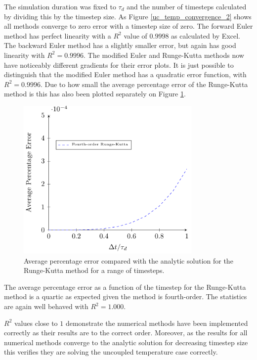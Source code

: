 \documentclass[../Interim_Report_Master]{subfiles}
\begin{document}
The simulation duration was fixed to $\tau_d$ and the number of timesteps calculated by dividing this by the timestep size. As Figure \ref{uc_temp_convergence_2} shows all methods converge to zero error with a timestep size of zero. The forward Euler method has perfect linearity with a $R^2$ value of $0.9998$ as calculated by Excel. The backward Euler method has a slightly smaller error, but again has good linearity with $R^2=0.9996$. The modified Euler and Runge-Kutta methods now have noticeably different gradients for their error plots. It is just possible to distinguish that the modified Euler method has a quadratic error function, with $R^2=0.9996$. Due to how small the average percentage error of the Runge-Kutta method is this has also been plotted separately on Figure \ref{uc_temp_convergence_3}.
\begin{figure}[H]
	\centering
	\includegraphics[width=0.8\textwidth]{./Diagrams/Uncoupled_Temp_Convergence_2/Uncoupled_Temp_Convergence_3.pdf}
	\caption{Average percentage error compared with the analytic solution for the Runge-Kutta method for a range of timesteps.}
	\label{uc_temp_convergence_3}
\end{figure}

The average percentage error as a function of the timestep for the Runge-Kutta method is a quartic as expected given the method is fourth-order. The statistics are again well behaved with $R^2=1.000$. 

$R^2$ values close to $1$ demonstrate the numerical methods have been implemented correctly as their results are to the correct order. Moreover, as the results for all numerical methods converge to the analytic solution for decreasing timestep size this verifies they are solving the uncoupled temperature case correctly.
\end{document}
